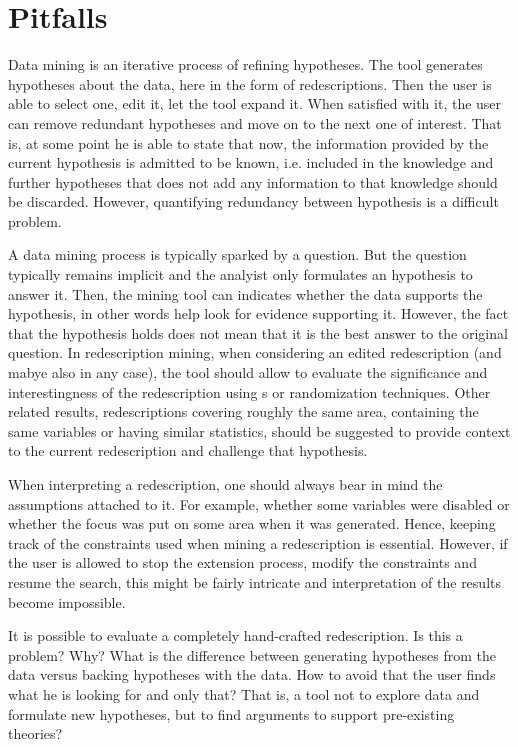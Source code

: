 \section{Pitfalls}

Data mining is an iterative process of refining hypotheses. The tool
generates hypotheses about the data, here in the form of
redescriptions. Then the user is able to select one, edit it, let the
tool expand it. When satisfied with it, the user can remove redundant
hypotheses and move on to the next one of interest. That is, at some
point he is able to state that now, the information provided by the
current hypothesis is admitted to be known, i.e. included in the
knowledge and further hypotheses that does not add any information to
that knowledge should be discarded.
However, quantifying redundancy between hypothesis is a difficult problem.

A data mining process is typically sparked by a question. But the
question typically remains implicit and the analyist only formulates
an hypothesis to answer it. Then, the mining tool can indicates
whether the data supports the hypothesis, in other words help look for
evidence supporting it. However, the fact that the hypothesis holds
does not mean that it is the best answer to the original question.  In
redescription mining, when considering an edited redescription (and
mabye also in any case), the tool should allow to evaluate the
significance and interestingness of the redescription using \pValue{}s
or randomization techniques.  Other related results, redescriptions
covering roughly the same area, containing the same variables or
having similar statistics, should be suggested to provide context to
the current redescription and challenge that hypothesis.

When interpreting a redescription, one should always bear in mind
the assumptions attached to it. For example, whether some variables
were disabled or whether the focus was put on some area when it was
generated.  Hence, keeping track of the constraints used when mining a
redescription is essential. However, if the user is allowed to stop
the extension process, modify the constraints and resume the search,
this might be fairly intricate and interpretation of the results
become impossible.

It is possible to evaluate a completely hand-crafted redescription. Is this a problem? Why?
What is the difference between generating hypotheses from the data versus backing hypotheses with the data.
How to avoid that the user finds what he is looking for and only that?
That is, a tool not to explore data and formulate new hypotheses, but to find arguments to support pre-existing theories?

